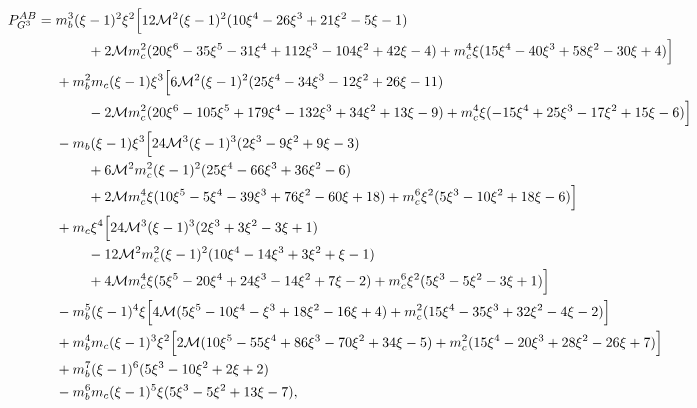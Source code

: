 \begin{align}
P^{AB}_{G^3}={}&
m_b^3(\xi-1)^2\xi^2\Big[
12\mathcal M^2(\xi-1)^2(10\xi^4-26\xi^3+21\xi^2-5\xi-1) \nonumber\\
&\hspace{0.8cm}
+2\mathcal M m_c^2(20\xi^6-35\xi^5-31\xi^4+112\xi^3-104\xi^2+42\xi-4)
+m_c^4\xi(15\xi^4-40\xi^3+58\xi^2-30\xi+4)\Big] \nonumber\\
&+m_b^2m_c(\xi-1)\xi^3\Big[
6\mathcal M^2(\xi-1)^2(25\xi^4-34\xi^3-12\xi^2+26\xi-11) \nonumber\\
&\hspace{0.8cm}
-2\mathcal M m_c^2(20\xi^6-105\xi^5+179\xi^4-132\xi^3+34\xi^2+13\xi-9)
+m_c^4\xi(-15\xi^4+25\xi^3-17\xi^2+15\xi-6)\Big] \nonumber\\
&-m_b(\xi-1)\xi^3\Big[
24\mathcal M^3(\xi-1)^3(2\xi^3-9\xi^2+9\xi-3) \nonumber\\
&\hspace{0.8cm}
+6\mathcal M^2m_c^2(\xi-1)^2(25\xi^4-66\xi^3+36\xi^2-6) \nonumber\\
&\hspace{0.8cm}
+2\mathcal M m_c^4\xi(10\xi^5-5\xi^4-39\xi^3+76\xi^2-60\xi+18)
+m_c^6\xi^2(5\xi^3-10\xi^2+18\xi-6)\Big] \nonumber\\
&+m_c\xi^4\Big[
24\mathcal M^3(\xi-1)^3(2\xi^3+3\xi^2-3\xi+1) \nonumber\\
&\hspace{0.8cm}
-12\mathcal M^2m_c^2(\xi-1)^2(10\xi^4-14\xi^3+3\xi^2+\xi-1) \nonumber\\
&\hspace{0.8cm}
+4\mathcal M m_c^4\xi(5\xi^5-20\xi^4+24\xi^3-14\xi^2+7\xi-2)
+m_c^6\xi^2(5\xi^3-5\xi^2-3\xi+1)\Big] \nonumber\\
&-m_b^5(\xi-1)^4\xi
\Big[4\mathcal M(5\xi^5-10\xi^4-\xi^3+18\xi^2-16\xi+4)
+m_c^2(15\xi^4-35\xi^3+32\xi^2-4\xi-2)\Big] \nonumber\\
&+m_b^4m_c(\xi-1)^3\xi^2
\Big[2\mathcal M(10\xi^5-55\xi^4+86\xi^3-70\xi^2+34\xi-5)
+m_c^2(15\xi^4-20\xi^3+28\xi^2-26\xi+7)\Big] \nonumber\\
&+m_b^7(\xi-1)^6(5\xi^3-10\xi^2+2\xi+2) \nonumber\\
&-m_b^6m_c(\xi-1)^5\xi(5\xi^3-5\xi^2+13\xi-7),
\end{align}
